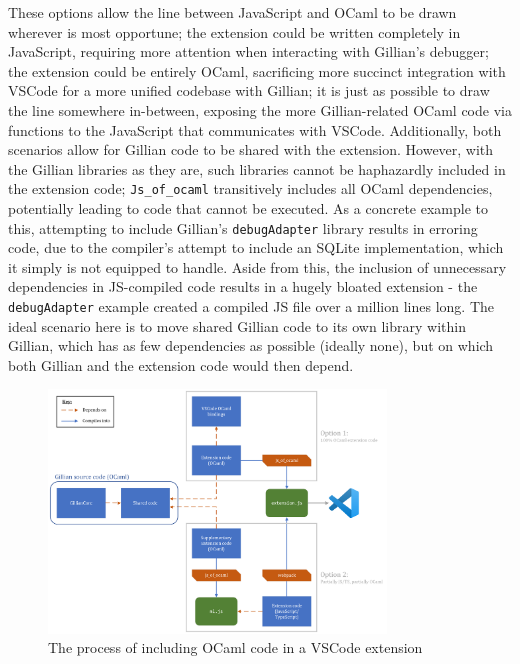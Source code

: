 These options allow the line between JavaScript and OCaml to be drawn wherever
is most opportune; the extension could be written completely in JavaScript,
requiring more attention when interacting with Gillian's debugger; the
extension could be entirely OCaml, sacrificing more succinct integration with
VSCode for a more unified codebase with Gillian; it is just as possible to draw
the line somewhere in-between, exposing the more Gillian-related OCaml code via
functions to the JavaScript that communicates with VSCode. Additionally, both
scenarios allow for Gillian code to be shared with the extension. However,
with the Gillian libraries as they are, such libraries cannot be haphazardly
included in the extension code; \texttt{Js\_of\_ocaml} transitively includes all
OCaml dependencies, potentially leading to code that cannot be executed. As a
concrete example to this, attempting to include Gillian's \texttt{debugAdapter}
library results in erroring code, due to the compiler's attempt to include an
SQLite implementation, which it simply is not equipped to handle. Aside from
this, the inclusion of unnecessary dependencies in JS-compiled code results in
a hugely bloated extension - the \texttt{debugAdapter} example created a
compiled JS file over a million lines long. The ideal scenario here is to move
shared Gillian code to its own library within Gillian, which has as few
dependencies as possible (ideally none), but on which both Gillian and the
extension code would then depend.

\begin{figure}
  \center
  \includegraphics[width=0.8\textwidth]{img/vscode-extension-with-ocaml.png}
  \caption{The process of including OCaml code in a VSCode extension}
  \label{fig:vscode-extension-with-ocaml}
\end{figure}

